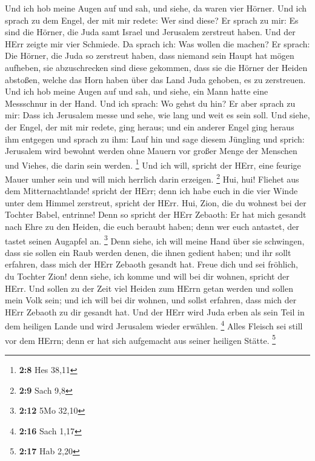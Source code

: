  Und ich hob meine Augen auf und sah, und siehe, da waren
vier Hörner.  Und ich sprach zu dem Engel, der mit mir
redete: Wer sind diese? Er sprach zu mir: Es sind die Hörner, die Juda
samt Israel und Jerusalem zerstreut haben.  Und der HErr
zeigte mir vier Schmiede.  Da sprach ich: Was wollen die
machen? Er sprach: Die Hörner, die Juda so zerstreut haben, dass niemand
sein Haupt hat mögen aufheben, sie abzuschrecken sind diese gekommen,
dass sie die Hörner der Heiden abstoßen, welche das Horn haben über das
Land Juda gehoben, es zu zerstreuen.  Und ich hob meine
Augen auf und sah, und siehe, ein Mann hatte eine Messschnur in der
Hand.  Und ich sprach: Wo gehst du hin? Er aber sprach zu
mir: Dass ich Jerusalem messe und sehe, wie lang und weit es sein soll.
 Und siehe, der Engel, der mit mir redete, ging heraus; und
ein anderer Engel ging heraus ihm entgegen  und sprach zu
ihm: Lauf hin und sage diesem Jüngling und sprich: Jerusalem wird
bewohnt werden ohne Mauern vor großer Menge der Menschen und Viehes, die
darin sein werden. \footnote{\textbf{2:8} Hes 38,11}  Und
ich will, spricht der HErr, eine feurige Mauer umher sein und will mich
herrlich darin erzeigen. \footnote{\textbf{2:9} Sach 9,8} 
Hui, hui! Fliehet aus dem Mitternachtlande! spricht der HErr; denn ich
habe euch in die vier Winde unter dem Himmel zerstreut, spricht der
HErr.  Hui, Zion, die du wohnest bei der Tochter Babel,
entrinne!  Denn so spricht der HErr Zebaoth: Er hat mich
gesandt nach Ehre zu den Heiden, die euch beraubt haben; denn wer euch
antastet, der tastet seinen Augapfel an. \footnote{\textbf{2:12} 5Mo
  32,10}  Denn siehe, ich will meine Hand über sie
schwingen, dass sie sollen ein Raub werden denen, die ihnen gedient
haben; und ihr sollt erfahren, dass mich der HErr Zebaoth gesandt hat.
 Freue dich und sei fröhlich, du Tochter Zion! denn siehe,
ich komme und will bei dir wohnen, spricht der HErr.  Und
sollen zu der Zeit viel Heiden zum HErrn getan werden und sollen mein
Volk sein; und ich will bei dir wohnen, und sollst erfahren, dass mich
der HErr Zebaoth zu dir gesandt hat.  Und der HErr wird
Juda erben als sein Teil in dem heiligen Lande und wird Jerusalem wieder
erwählen. \footnote{\textbf{2:16} Sach 1,17}  Alles Fleisch
sei still vor dem HErrn; denn er hat sich aufgemacht aus seiner heiligen
Stätte. \footnote{\textbf{2:17} Hab 2,20}

